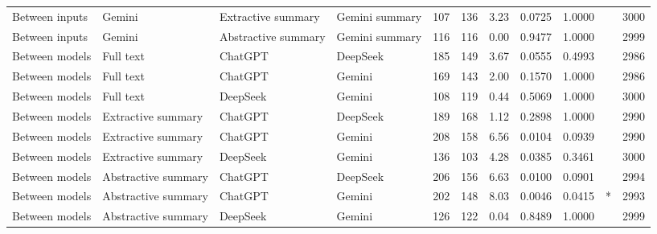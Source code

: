 \begin{tabular}{llllrrllllr}
Between inputs & Gemini & Extractive summary & Gemini summary & 107 & 136 & 3.23 & 0.0725 & 1.0000 &  & 3000 \\
Between inputs & Gemini & Abstractive summary & Gemini summary & 116 & 116 & 0.00 & 0.9477 & 1.0000 &  & 2999 \\
Between models & Full text & ChatGPT & DeepSeek & 185 & 149 & 3.67 & 0.0555 & 0.4993 &  & 2986 \\
Between models & Full text & ChatGPT & Gemini & 169 & 143 & 2.00 & 0.1570 & 1.0000 &  & 2986 \\
Between models & Full text & DeepSeek & Gemini & 108 & 119 & 0.44 & 0.5069 & 1.0000 &  & 3000 \\
Between models & Extractive summary & ChatGPT & DeepSeek & 189 & 168 & 1.12 & 0.2898 & 1.0000 &  & 2990 \\
Between models & Extractive summary & ChatGPT & Gemini & 208 & 158 & 6.56 & 0.0104 & 0.0939 &  & 2990 \\
Between models & Extractive summary & DeepSeek & Gemini & 136 & 103 & 4.28 & 0.0385 & 0.3461 &  & 3000 \\
Between models & Abstractive summary & ChatGPT & DeepSeek & 206 & 156 & 6.63 & 0.0100 & 0.0901 &  & 2994 \\
Between models & Abstractive summary & ChatGPT & Gemini & 202 & 148 & 8.03 & 0.0046 & 0.0415 & * & 2993 \\
Between models & Abstractive summary & DeepSeek & Gemini & 126 & 122 & 0.04 & 0.8489 & 1.0000 &  & 2999 \\
\bottomrule
\end{tabular}
